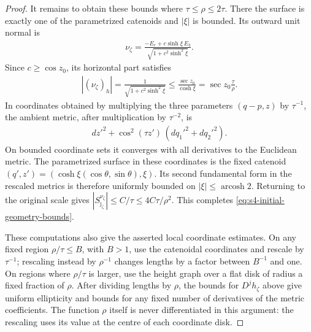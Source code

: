 \documentclass[a4paper,11pt,oneside,reqno]{amsart}
\numberwithin{equation}{section}
\theoremstyle{definition}
\begin{document}
\begin{proof}
    It remains to obtain these bounds where
    $\tau\leq\rho\leq2\tau$. There the surface is exactly
    one of the parametrized catenoids and $|\xi|$ is
    bounded. Its outward unit normal is
    \begin{align*}
        \nu_\zeta
        =\frac{-E_r+c\sinh\xi\,E_3}
               {\sqrt{1+c^2\sinh^2\xi}}.
    \end{align*}
    Since $c\geq\cos z_0$, its horizontal part satisfies
    \begin{align*}
        |(\nu_\zeta)_h|
        =\frac1{\sqrt{1+c^2\sinh^2\xi}}
        \leq\frac{\sec z_0}{\cosh\xi}
        =\sec z_0\frac{\tau}{\rho}.
    \end{align*}
    In coordinates obtained by multiplying the three
    parameters $(q-p,z)$ by $\tau^{-1}$, the ambient
    metric, after multiplication by $\tau^{-2}$, is
    \begin{align*}
        dz'^2+\cos^2(\tau z')\,(dq_1'^2+dq_2'^2).
    \end{align*}
    On bounded coordinate sets it converges with all
    derivatives to the Euclidean metric. The parametrized
    surface in these coordinates is the fixed catenoid
    $(q',z')=(\cosh\xi(\cos\theta,\sin\theta),\xi)$.
    Its second fundamental form in the rescaled metrics
    is therefore uniformly bounded on $|\xi|\leq
    \operatorname{arcosh}2$. Returning to the original
    scale gives $|S_{\jmath_\zeta}^{\nu_\zeta}|\leq C/\tau
    \leq4C\tau/\rho^2$. This completes
    \eqref{eq:s4-initial-geometry-bounds}.

    These computations also give the asserted local
    coordinate estimates. On any fixed region
    $\rho/\tau\leq B$, with $B>1$, use the catenoidal
    coordinates and rescale by $\tau^{-1}$; rescaling
    instead by $\rho^{-1}$ changes lengths by a factor
    between $B^{-1}$ and one. On regions where
    $\rho/\tau$ is larger, use the height graph over a
    flat disk of radius a fixed fraction of $\rho$.
    After dividing lengths by $\rho$, the bounds for
    $D^jh_\zeta$ above give uniform ellipticity and bounds
    for any fixed number of derivatives of the metric
    coefficients. The function $\rho$ itself is never
    differentiated in this argument: the rescaling uses
    its value at the centre of each coordinate disk.


\end{proof}
\end{document}
